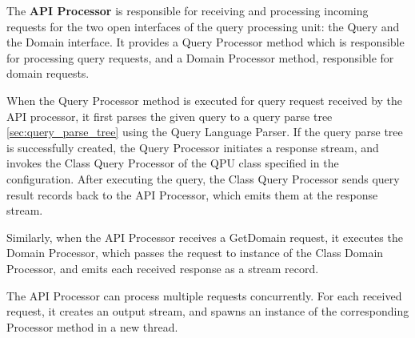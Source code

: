 \medskip
\noindent
The \textbf{API Processor} is responsible for receiving and processing incoming requests for the two open interfaces of
the query processing unit:
the Query and the Domain interface.
It provides a Query Processor method which is responsible for processing query requests,
and a Domain Processor method, responsible for domain requests.

When the Query Processor method is executed for query request received by the API processor,
it first parses the given query to a query parse tree \ref{sec:query_parse_tree} using the Query Language Parser.
If the query parse tree is successfully created, the Query Processor initiates a response stream,
and invokes the Class Query Processor of the QPU class specified in the configuration.
After executing the query, the Class Query Processor sends query result records back to the API Processor,
which emits them at the response stream.

Similarly, when the API Processor receives a GetDomain request,
it executes the Domain Processor, which passes the request to instance of the Class Domain Processor,
and emits each received response as a stream record.

The API Processor can process multiple requests concurrently.
For each received request, it creates an output stream,
and spawns an instance of the corresponding Processor method in a new thread.

